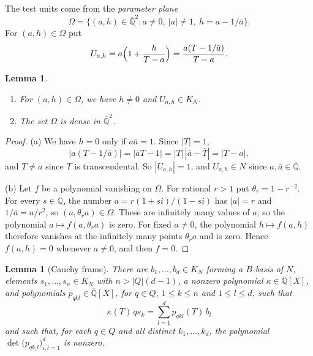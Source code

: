 \documentclass[10pt]{article}
\newtheorem{lem}[thm]{Lemma}
\theoremstyle{remark}
\newcommand{\Q}{\mathbb Q}
\newcommand{\Qbar}{\overline{\mathbb Q}}
\begin{document}
The test units come from the \emph{parameter plane}
\[
 \Omega=\{(a,h)\in\Qbar^2:a\ne0,\ |a|\ne1,\ h=a-1/\bar a\}.
\]
For $(a,h)\in\Omega$ put
\[
 U_{a,h}=a\Bigl(1+\frac h{T-a}\Bigr)=\frac{a(T-1/\bar a)}{T-a}.
\]

\begin{lem}\label{lem:omega}
\begin{enumerate}
\item[(a)] For $(a,h)\in\Omega$, we have $h\ne0$ and $U_{a,h}\in K_N$.
\item[(b)] The set $\Omega$ is dense in $\Qbar^2$.
\end{enumerate}
\end{lem}

\begin{proof}
(a) We have $h=0$ only if $a\bar a=1$. Since $|T|=1$,
\[
 |a(T-1/\bar a)|=|\bar aT-1|=|T|\,|\bar a-\bar T|=|T-a|,
\]
and $T\ne a$ since $T$ is transcendental. So $|U_{a,h}|=1$, and $U_{a,h}\in N$ since $a,\bar a\in\Qbar$.

(b) Let $f$ be a polynomial vanishing on $\Omega$. For rational $r>1$ put $\theta_r=1-r^{-2}$. For every $s\in\Q$, the number $a=r(1+si)/(1-si)$ has $|a|=r$ and $1/\bar a=a/r^2$, so $(a,\theta_ra)\in\Omega$. These are infinitely many values of $a$, so the polynomial $a\mapsto f(a,\theta_ra)$ is zero. For fixed $a\ne0$, the polynomial $h\mapsto f(a,h)$ therefore vanishes at the infinitely many points $\theta_ra$ and is zero. Hence $f(a,h)=0$ whenever $a\ne0$, and then $f=0$.
\end{proof}

\begin{lem}[Cauchy frame]\label{lem:frame}
There are $b_1,\ldots,b_d\in K_N$ forming a $B$-basis of $N$, elements $s_1,\ldots,s_n\in K_N$ with $n>|Q|(d-1)$, a nonzero polynomial $\kappa\in\Qbar[X]$, and polynomials $p_{qkl}\in\Qbar[X]$, for $q\in Q$, $1\le k\le n$ and $1\le l\le d$, such that
\begin{equation}\label{eq:frame}
 \kappa(T)\,qs_k=\sum_{l=1}^dp_{qkl}(T)\,b_l
\end{equation}
and such that, for each $q\in Q$ and all distinct $k_1,\ldots,k_d$, the polynomial $\det\bigl(p_{qk_il}\bigr)_{i,l=1}^d$ is nonzero.
\end{lem}
\end{document}
